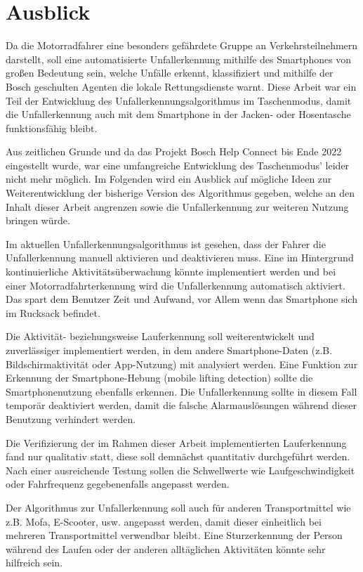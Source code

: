 \chapter{Ausblick}

Da die Motorradfahrer eine besonders gefährdete Gruppe an Verkehrsteilnehmern darstellt, soll eine automatisierte Unfallerkennung mithilfe des Smartphones von großen Bedeutung sein, welche Unfälle erkennt, klassifiziert und mithilfe der Bosch geschulten Agenten die lokale Rettungsdienste warnt. Diese Arbeit war ein Teil der Entwicklung des Unfallerkennungsalgorithmus im Taschenmodus, damit die Unfallerkennung auch mit dem Smartphone in der Jacken- oder Hosentasche funktionsfähig bleibt.

Aus zeitlichen Grunde und da das Projekt \glqq Bosch Help Connect\grqq{} bis Ende 2022 eingestellt wurde, war eine umfangreiche Entwicklung des Taschenmodus' leider nicht mehr möglich.
Im Folgenden wird ein Ausblick auf mögliche Ideen zur Weiterentwicklung der bisherige Version des Algorithmus gegeben, welche an den Inhalt dieser Arbeit angrenzen sowie die Unfallerkennung zur weiteren Nutzung bringen würde.

Im aktuellen Unfallerkennungsalgorithmus ist gesehen, dass der Fahrer die Unfallerkennung manuell aktivieren und deaktivieren muss. Eine im Hintergrund kontinuierliche Aktivitätsüberwachung könnte implementiert werden und bei einer Motorradfahrterkennung wird die Unfallerkennung automatisch aktiviert. Das spart dem Benutzer Zeit und Aufwand, vor Allem wenn das Smartphone sich im Rucksack befindet. %

Die Aktivität- beziehungsweise Lauferkennung soll weiterentwickelt und zuverlässiger implementiert werden, in dem andere Smartphone-Daten (z.B. Bildschirmaktivität oder App-Nutzung) mit analysiert werden.
Eine Funktion zur Erkennung der Smart\-phone-Hebung (mobile lifting detection) sollte die Smartphonenutzung ebenfalls erkennen. Die Unfallerkennung sollte in diesem Fall temporär deaktiviert werden, damit die falsche Alarmauslösungen während dieser Benutzung verhindert werden.

Die Verifizierung der im Rahmen dieser Arbeit implementierten Lauferkennung fand nur qualitativ statt, diese soll demnächst quantitativ durchgeführt werden. Nach einer ausreichende Testung sollen die Schwellwerte wie Laufgeschwindigkeit oder Fahrfrequenz gegebenenfalls angepasst werden.

Der Algorithmus zur Unfallerkennung soll auch für anderen Transportmittel wie z.B. Mofa, E-Scooter, usw. angepasst werden, damit dieser einheitlich bei mehreren Transportmittel verwendbar bleibt. Eine Sturzerkennung der Person während des Laufen oder der anderen alltäglichen Aktivitäten könnte sehr hilfreich sein.

